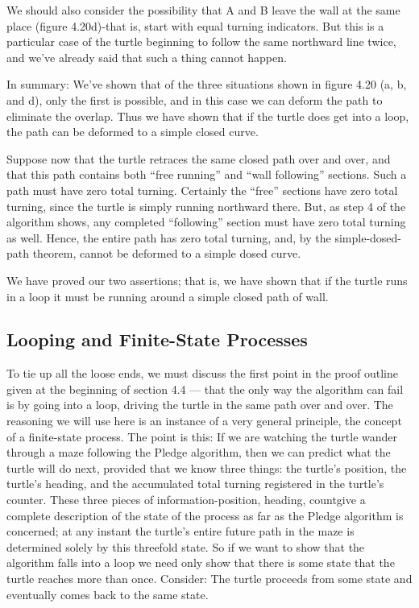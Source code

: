 \documentclass{book}
\begin{document}
We should also consider the possibility that A and B leave the wall
at the same place (figure 4.20d)-that is, start with equal turning indicators. But this is a particular case of the turtle beginning to follow
the same northward line twice, and we've already said that such a thing
cannot happen.

In summary: We've shown that of the three situations shown in figure
4.20 (a, b, and d), only the first is possible, and in this case we can
deform the path to eliminate the overlap. Thus we have shown that if
the turtle does get into a loop, the path can be deformed to a simple
closed curve.

Suppose now that the turtle retraces the same closed path over and
over, and that this path contains both ``free running'' and ``wall following'' sections. Such a path must have zero total turning. Certainly the
``free'' sections have zero total turning, since the turtle is simply running
northward there. But, as step 4 of the algorithm shows, any completed
``following'' section must have zero total turning as well. Hence, the entire path has zero total turning, and, by the simple-dosed-path theorem,
cannot be deformed to a simple dosed curve.

We have proved our two assertions; that is, we have shown that if the
turtle runs in a loop it must be running around a simple closed path of
wall.

\subsection{Looping and Finite-State Processes}

To tie up all the loose ends, we must discuss the first point in the proof
outline given at the beginning of section 4.4 --- that the only way the
algorithm can fail is by going into a loop, driving the turtle in the same
path over and over. The reasoning we will use here is an instance of a
very general principle, the concept of a finite-state process. The point
is this: If we are watching the turtle wander through a maze following
the Pledge algorithm, then we can predict what the turtle will do next,
provided that we know three things: the turtle's position, the turtle's
heading, and the accumulated total turning registered in the turtle's
counter. These three pieces of information-position, heading, countgive a complete description of the state of the process as far as the Pledge
algorithm is concerned; at any instant the turtle's entire future path in
the maze is determined solely by this threefold state. So if we want to
show that the algorithm falls into a loop we need only show that there is
some state that the turtle reaches more than once. Consider: The turtle
proceeds from some state and eventually comes back to the same state.
\end{document}
